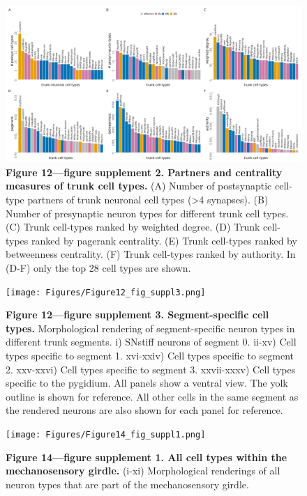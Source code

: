 \documentclass[
  11pt,
]{article}
\begin{document}
\begin{figure}[H]

{\centering \includegraphics[width=1\textwidth,height=\textheight]{Figures/Figure12_fig_suppl2.png}

}

\caption{\textbf{Figure 12---figure supplement 2. Partners and
centrality measures of trunk cell types.} (A) Number of postsynaptic
cell-type partners of trunk neuronal cell types (\textgreater4
synapses). (B) Number of presynaptic neuron types for different trunk
cell types. (C) Trunk cell-types ranked by weighted degree. (D) Trunk
cell-types ranked by pagerank centrality. (E) Trunk cell-types ranked by
betweenness centrality. (F) Trunk cell-types ranked by authority. In
(D-F) only the top 28 cell types are shown.}

\end{figure}%

\begin{figure}[H]

{\centering \texttt{[image: Figures/Figure12\_fig\_suppl3.png]}

}

\caption{\textbf{Figure 12---figure supplement 3. Segment-specific cell
types. } Morphological rendering of segment-specific neuron types in
different trunk segments. i) SNstiff neurons of segment 0. ii-xv) Cell
types specific to segment 1. xvi-xxiv) Cell types specific to segment 2.
xxv-xxvi) Cell types specific to segment 3. xxvii-xxxv) Cell types
specific to the pygidium. All panels show a ventral view. The yolk
outline is shown for reference. All other cells in the same segment as
the rendered neurons are also shown for each panel for reference.}

\end{figure}%

\begin{figure}[H]

{\centering \texttt{[image: Figures/Figure14\_fig\_suppl1.png]}

}

\caption{\textbf{Figure 14---figure supplement 1. All cell types within
the mechanosensory girdle. } (i-xi) Morphological renderings of all
neuron types that are part of the mechanosensory girdle.}

\end{figure}%
\end{document}
